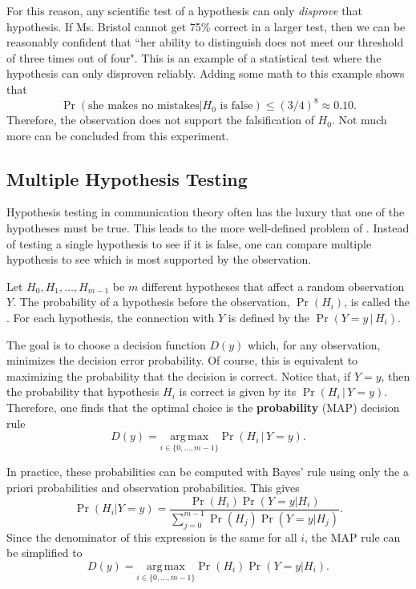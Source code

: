 For this reason, any scientific test of a hypothesis can only \emph{disprove} that hypothesis.
If Ms. Bristol cannot get 75\% correct in a larger test, then we can be reasonably confident that ``her ability to distinguish does not meet our threshold of three times out of four".
This is an example of a  statistical test where the hypothesis can only disproven reliably.
Adding some math to this example shows that
\[ \Pr (\text{she makes no mistakes} | H_0 \text{ is false}) \leq (3/4)^8 \approx 0.10. \]
Therefore, the observation does not support the falsification of $H_0$.
Not much more can be concluded from this experiment.

\subsection{Multiple Hypothesis Testing}

Hypothesis testing in communication theory often has the luxury that one of the hypotheses must be true.
This leads to the more well-defined problem of .
Instead of testing a single hypothesis to see if it is false, one can compare multiple hypothesis to see which is most supported by the observation.

Let $H_0,H_1,\ldots,H_{m-1}$ be $m$ different hypotheses that affect a random observation $Y$.
The probability of a hypothesis before the observation, $\Pr(H_i)$, is called the .
For each hypothesis, the connection with $Y$ is defined by the  $\Pr (Y=y \, | \, H_i)$.

The goal is to choose a decision function $D(y)$ which, for any observation, minimizes the decision error probability.
Of course, this is equivalent to maximizing the probability that the decision is correct.
Notice that, if $Y=y$, then the probability that hypothesis $H_i$ is correct is given by its  $\Pr (H_i \, | \, Y=y )$.
Therefore, one finds that the optimal choice is the  \textbf{probability} (MAP) decision rule 
\[ D(y) = \underset{i\in\{0,\ldots,m-1\}}{\mathrm{arg\,max}} \Pr( H_i \, |  \, Y=y). \]

In practice, these probabilities can be computed with Bayes' rule using only the a priori probabilities and observation probabilities.
This gives
\[ \Pr \left(H_i | Y=y \right) =
\frac{\Pr(H_i) \Pr (Y=y | H_i) }{\sum_{j=0}^{m-1} \Pr(H_j) \Pr (Y=y | H_j)}. \]
Since the denominator of this expression is the same for all $i$, the MAP rule can be simplified to
\[ D(y) = \underset{i\in\{0,\ldots,m-1\}}{\mathrm{arg\,max}} \Pr(H_i) \Pr (Y=y | H_i). \]

